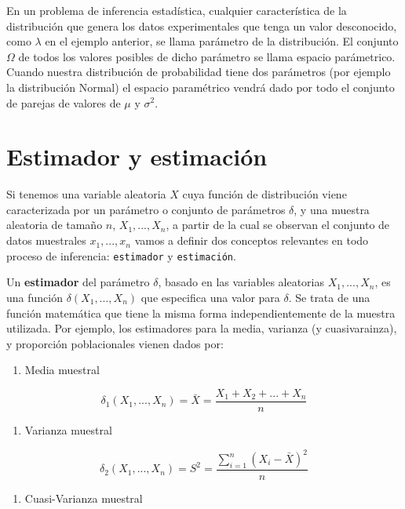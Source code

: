 \documentclass[
]{book}
\providecommand{\tightlist}{%
  \setlength{\itemsep}{0pt}\setlength{\parskip}{0pt}}
\begin{document}
En un problema de inferencia estadística, cualquier característica de la distribución que genera los datos experimentales que tenga un valor desconocido, como \(\lambda\) en el ejemplo anterior, se llama parámetro de la distribución. El conjunto \(\Omega\) de todos los valores posibles de dicho parámetro se llama espacio parámetrico. Cuando nuestra distribución de probabilidad tiene dos parámetros (por ejemplo la distribución Normal) el espacio paramétrico vendrá dado por todo el conjunto de parejas de valores de \(\mu\) y \(\sigma^2\).

\hypertarget{estimador-y-estimaciuxf3n}{%
\section{Estimador y estimación}\label{estimador-y-estimaciuxf3n}}

Si tenemos una variable aleatoria \(X\) cuya función de distribución viene caracterizada por un parámetro o conjunto de parámetros \(\delta\), y una muestra aleatoria de tamaño \(n\), \(X_1,...,X_n\), a partir de la cual se observan el conjunto de datos muestrales \(x_1,...,x_n\) vamos a definir dos conceptos relevantes en todo proceso de inferencia: \texttt{estimador} y \texttt{estimación}.

Un \textbf{estimador} del parámetro \(\delta\), basado en las variables aleatorias \(X_1,...,X_n\), es una función \(\delta(X_1,...,X_n)\) que especifica una valor para \(\delta\). Se trata de una función matemática que tiene la misma forma independientemente de la muestra utilizada. Por ejemplo, los estimadores para la media, varianza (y cuasivarainza), y proporción poblacionales vienen dados por:

\begin{enumerate}
\def\labelenumi{\arabic{enumi}.}
\tightlist
\item
  Media muestral
\end{enumerate}

\[\delta_1(X_1,...,X_n) = \bar{X} = \frac{X_1+X_2+...+X_n}{n}\]

\begin{enumerate}
\def\labelenumi{\arabic{enumi}.}
\setcounter{enumi}{1}
\tightlist
\item
  Varianza muestral
\end{enumerate}

\[\delta_2(X_1,...,X_n) = S^2 = \frac{\sum_{i=1}^n (X_i-\bar{X})^2}{n}\]

\begin{enumerate}
\def\labelenumi{\arabic{enumi}.}
\setcounter{enumi}{2}
\tightlist
\item
  Cuasi-Varianza muestral
\end{enumerate}
\end{document}
